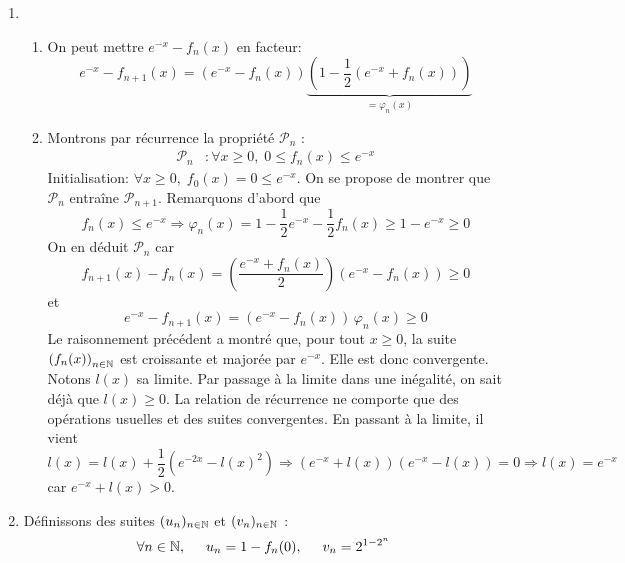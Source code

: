 \begin{enumerate}
 \item \begin{enumerate}
 \item On peut mettre $e^{-x}-f_n(x)$ en facteur:
 \begin{displaymath}
   e^{-x} - f_{n+1}(x) = \left( e^{-x}-f_n(x)\right) 
    \underset{=\varphi_n(x)}{\underbrace{\left(1-\frac{1}{2}(e^{-x}+f_n(x))\right)}} 
 \end{displaymath}
 \item Montrons par récurrence la propriété $\mathcal P _n$ :
\begin{align*}
 \mathcal P _n &: \forall x \geq 0,\; 0 \leq f_{n}(x) \leq e^{-x}
\end{align*}
Initialisation: $\forall x\geq 0, \; f_0(x) = 0 \leq e^{-x}$.\newline
On se propose de montrer que $\mathcal P _{n}$ entraîne $\mathcal P _{n+1}$. Remarquons d'abord que 
\begin{displaymath}
 f_n(x)\leq e^{-x}\Rightarrow \varphi_n(x)=1-\frac{1}{2}e^{-x}-\frac{1}{2}f_n(x) \geq 1 - e^{-x}\geq0
\end{displaymath}
On en déduit $\mathcal{P}_{n}$ car
\begin{displaymath}
f_{n+1}(x)-f_n(x) = \left( \frac{e^{-x}+f_n(x)}{2}\right) \left( e^{-x}-f_n(x)\right)\geq 0   
\end{displaymath}
et
\begin{displaymath}
  e^{-x} - f_{n+1}(x)=\left( e^{-x}-f_n(x)\right)\, \varphi_n(x)\geq 0 
\end{displaymath}
Le raisonnement précédent a montré que, pour tout $x\geq 0$, la suite $\left( f_n(x)\right)_{n\in \mathbb{N}}$ est croissante et majorée par $e^{-x}$. Elle est donc convergente. Notons $l(x)$ sa limite. Par passage à la limite dans une inégalité, on sait déjà que $l(x)\geq0$.\newline
La relation de récurrence ne comporte que des opérations usuelles et des suites convergentes. En passant à la limite, il vient
\begin{displaymath}
  l(x) = l(x) + \frac{1}{2}\left( e^{-2x}-l(x)^2\right)\Rightarrow (e^{-x}+l(x))(e^{-x}-l(x))=0\Rightarrow l(x) = e^{-x} 
\end{displaymath}
car $e^{-x} + l(x) >0$.
\end{enumerate}
\item Définissons des suites  $(u_n)_{n\in\mathbb{N}}$ et $(v_n)_{n\in\mathbb{N}}$ :
\begin{displaymath}
\forall n\in \N, \hspace{0.5cm} u_n = 1 -f_n(0), \hspace{0.5cm} v_n = 2^{1 - 2^{n}}

\end{displaymath}
\end{enumerate}
